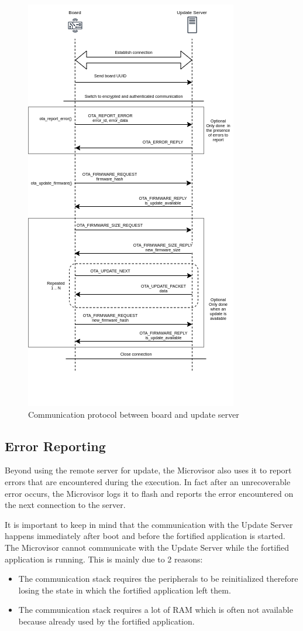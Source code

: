 \documentclass{article}
\begin{document}
\begin{figure}
	\centering
	\includegraphics[scale=.77]{images/comm_proto.png}
	\caption{Communication protocol between board and update server}
	\label{fig:comm_proto}
\end{figure}

\subsection{Error Reporting}
Beyond using the remote server for update, the Microvisor also uses it to report errors that are encountered during the execution. In fact after an unrecoverable error occurs, the Microvisor logs it to flash and reports the error encountered on the next connection to the server.

It is important to keep in mind that the communication with the Update Server happens immediately after boot and before the fortified application is started. The Microvisor cannot communicate with the Update Server while the fortified application is running. This is mainly due to 2 reasons:
\begin{itemize}
	\item The communication stack requires the peripherals to be reinitialized therefore losing the state in which the fortified application left them.
	\item The communication stack requires a lot of RAM which is often not available because already used by the fortified application.
\end{itemize}
\end{document}
